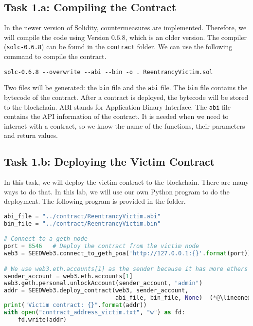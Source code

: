 \subsection{Task 1.a: Compiling the Contract} 

In the newer version of Solidity, countermeasures are implemented.
Therefore, we will compile the code using Version 0.6.8, which 
is an older version. The compiler (\texttt{solc-0.6.8}) can be found in the 
\texttt{contract} folder. We can use the following command to 
compile the contract. 

\begin{lstlisting}
solc-0.6.8 --overwrite --abi --bin -o . ReentrancyVictim.sol
\end{lstlisting}
 
Two files will be generated: the \texttt{bin} file and the \texttt{abi} file.   
The \texttt{bin} file contains the bytecode of the contract. After 
a contract is deployed, the bytecode will be stored to the blockchain.
ABI stands for Application Binary Interface. The \texttt{abi} file contains 
the API information of the contract. It is needed when we need to 
interact with a contract, so we know the name of the functions,
their parameters and return values. 



\subsection{Task 1.b: Deploying the Victim Contract} 

In this task, we will deploy the victim contract to the 
blockchain. There are many ways to do that. In this lab, 
we will use our own Python program to do the deployment.
The following program is provided in the 
folder. 

\begin{lstlisting}[language=python, 
    caption={Deploying the victim contract (\texttt{deploy\_victim\_contrac.py})}]
abi_file = "../contract/ReentrancyVictim.abi"
bin_file = "../contract/ReentrancyVictim.bin"

# Connect to a geth node
port = 8546   # Deploy the contract from the victim node
web3 = SEEDWeb3.connect_to_geth_poa('http://127.0.0.1:{}'.format(port))

# We use web3.eth.accounts[1] as the sender because it has more ethers
sender_account = web3.eth.accounts[1]
web3.geth.personal.unlockAccount(sender_account, "admin")
addr = SEEDWeb3.deploy_contract(web3, sender_account,
                                abi_file, bin_file, None)  (*@\lineone@*) 
print("Victim contract: {}".format(addr))
with open("contract_address_victim.txt", "w") as fd:
    fd.write(addr)
\end{lstlisting}

